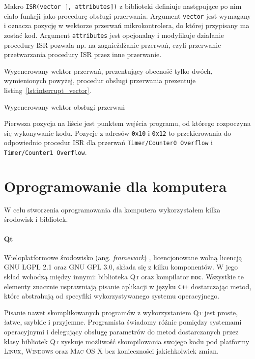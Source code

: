Makro \texttt{ISR(vector [, attributes])} z biblioteki  definiuje następujące po nim ciało funkcji jako procedurę obsługi przerwania. Argument \texttt{vector} jest wymagany i oznacza pozycję w wektorze przerwań mikrokontrolera, do której przypisany ma zostać kod. Argument \texttt{attributes} jest opcjonalny i modyfikuje działanie procedury ISR \ppauza pozwala np. na zagnieżdżanie przerwań, czyli przerwanie przetwarzania procedury ISR przez inne przerwanie.

Wygenerowany wektor przerwań, prezentujący obecność tylko dwóch, wymienionych powyżej, procedur obsługi przerwania prezentuje listing~\ref{lst:interrupt_vector}.

\begin{listing}
  
  \caption[Wektor obsługi przerwań]{Wygenerowany wektor obsługi przerwań}
  \label{lst:interrupt_vector}
\end{listing}

Pierwsza pozycja na liście jest punktem wejścia programu, od którego rozpoczyna się wykonywanie kodu. Pozycje z adresów \texttt{0x10} i \texttt{0x12} to przekierowania do odpowiednio procedur ISR dla przerwań \texttt{Timer/Counter0 Overflow} i \texttt{Timer/Counter1 Overflow}.

\section{Oprogramowanie dla komputera}
W celu stworzenia oprogramowania dla komputera wykorzystałem kilka środowisk i bibliotek.

\paragraph{Qt}
Wieloplatformowe środowisko (ang. \textsl{framework}) , licencjonowane wolną licencją \textsc{GNU LGPL 2.1} oraz \textsc{GNU GPL 3.0}, składa się z kilku komponentów. W jego skład wchodzą między innymi: biblioteka \textsc{Qt} oraz kompilator \verb|moc|. Wszystkie te elementy znacznie usprawniają pisanie aplikacji w języku \verb|C++| dostarczając metod, które abstrahują od specyfiki wykorzystywanego systemu operacyjnego.

Pisanie nawet skomplikowanych programów z wykorzystaniem \textsc{Qt} jest proste, łatwe, szybkie i przyjemne. Programista świadomy różnic pomiędzy systemami operacyjnymi i delegujący obsługę parametrów do metod dostarczanych przez klasy bibliotek \textsc{Qt} zyskuje możliwość skompilowania swojego kodu pod platformy \textsc{Linux}, \textsc{Windows} oraz \textsc{Mac OS X} bez konieczności jakichkolwiek zmian.

